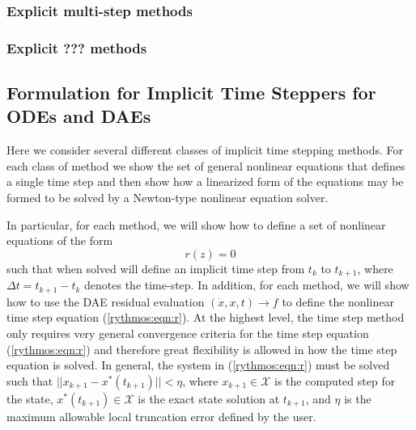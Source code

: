 \documentclass[pdf,ps2pdf,11pt]{SANDreport}
\begin{document}
\subsubsection{Explicit multi-step methods}

\subsubsection{Explicit ??? methods}

\subsection{Formulation for Implicit Time Steppers for ODEs and DAEs}

Here we consider several different classes of implicit time stepping methods.
For each class of method we show the set of general nonlinear equations that
defines a single time step and then show how a linearized form of the
equations may be formed to be solved by a Newton-type nonlinear equation
solver.

In particular, for each method, we will show how to define a set of nonlinear
equations of the form
%
\begin{equation}
r(z) = 0
\label{rythmos:eqn:r}
\end{equation}
%
such that when solved will define an implicit time step from $t_k$ to
$t_{k+1}$, where $\Delta t = t_{k+1} - t_k$ denotes the time-step.  In
addition, for each method, we will show how to use the DAE residual evaluation
$(\dot{x},x,t) {}\rightarrow f$ to define the nonlinear time step equation
(\ref{rythmos:eqn:r}).  At the highest level, the time step method only
requires very general convergence criteria for the time step equation
(\ref{rythmos:eqn:r}) and therefore great flexibility is allowed in how the
time step equation is solved.  In general, the system in (\ref{rythmos:eqn:r})
must be solved such that $||x_{k+1} - x^*(t_{k+1})|| < \eta$, where
$x_{k+1}\in\mathcal{X}$ is the computed step for the state,
$x^*(t_{k+1})\in\mathcal{X}$ is the exact state solution at $t_{k+1}$, and
$\eta$ is the maximum allowable local truncation error defined by the user.
\end{document}
